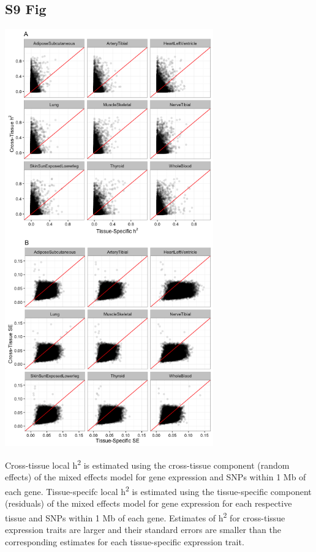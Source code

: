 \documentclass[10pt,letterpaper]{article}
\begin{document}
\begin{singlespace}
\subsection*{S9 Fig}
\includegraphics[width=9cm]{Figures/GenArch_Supp/S6Fig.png}
\label{S9_Fig}

 Cross-tissue local h\textsuperscript{2} is estimated using the cross-tissue component (random effects) of the mixed effects model for gene expression and SNPs within 1 Mb of each gene. Tissue-specifc local h\textsuperscript{2} is estimated using the tissue-specific component (residuals) of the mixed effects model for gene expression for each respective tissue and SNPs within 1 Mb of each gene. Estimates of h\textsuperscript{2} for cross-tissue expression traits are larger and their standard errors are smaller than the corresponding estimates for each tissue-specific expression trait.


\end{singlespace}
\end{document}
